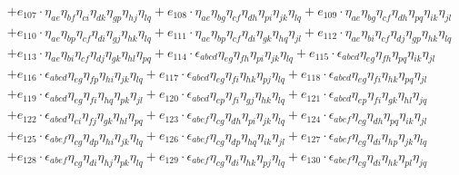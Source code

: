 \begin{itemize}
\begin{align}
    & + e_{107} \cdot \eta_{a e} \eta_{b f} \eta_{c i} \eta_{d k} \eta_{g p} \eta_{h j} \eta_{l q} + e_{108} \cdot \eta_{a e} \eta_{b g} \eta_{c f} \eta_{d h} \eta_{p i} \eta_{j k} \eta_{l q} + e_{109} \cdot \eta_{a e} \eta_{b g} \eta_{c f} \eta_{d h} \eta_{p q} \eta_{i k} \eta_{j l} \nonumber \\
    & + e_{110} \cdot \eta_{a e} \eta_{b p} \eta_{c f} \eta_{d i} \eta_{g j} \eta_{h k} \eta_{l q} + e_{111} \cdot \eta_{a e} \eta_{b p} \eta_{c f} \eta_{d i} \eta_{g k} \eta_{h q} \eta_{j l} + e_{112} \cdot \eta_{a e} \eta_{b i} \eta_{c f} \eta_{d j} \eta_{g p} \eta_{h k} \eta_{l q} \nonumber \\
    & + e_{113} \cdot \eta_{a e} \eta_{b i} \eta_{c f} \eta_{d j} \eta_{g k} \eta_{h l} \eta_{p q} + e_{114} \cdot \epsilon_{a b c d} \eta_{e g} \eta_{f h} \eta_{p i} \eta_{j k} \eta_{l q} + e_{115} \cdot \epsilon_{a b c d} \eta_{e g} \eta_{f h} \eta_{p q} \eta_{i k} \eta_{j l} \nonumber \\
    & + e_{116} \cdot \epsilon_{a b c d} \eta_{e g} \eta_{f p} \eta_{h i} \eta_{j k} \eta_{l q} + e_{117} \cdot \epsilon_{a b c d} \eta_{e g} \eta_{f i} \eta_{h k} \eta_{p j} \eta_{l q} + e_{118} \cdot \epsilon_{a b c d} \eta_{e g} \eta_{f i} \eta_{h k} \eta_{p q} \eta_{j l} \nonumber \\
    & + e_{119} \cdot \epsilon_{a b c d} \eta_{e g} \eta_{f i} \eta_{h q} \eta_{p k} \eta_{j l} + e_{120} \cdot \epsilon_{a b c d} \eta_{e p} \eta_{f i} \eta_{g j} \eta_{h k} \eta_{l q} + e_{121} \cdot \epsilon_{a b c d} \eta_{e p} \eta_{f i} \eta_{g k} \eta_{h l} \eta_{j q} \nonumber \\
    & + e_{122} \cdot \epsilon_{a b c d} \eta_{e i} \eta_{f j} \eta_{g k} \eta_{h l} \eta_{p q} + e_{123} \cdot \epsilon_{a b e f} \eta_{c g} \eta_{d h} \eta_{p i} \eta_{j k} \eta_{l q} + e_{124} \cdot \epsilon_{a b e f} \eta_{c g} \eta_{d h} \eta_{p q} \eta_{i k} \eta_{j l} \nonumber \\
    & + e_{125} \cdot \epsilon_{a b e f} \eta_{c g} \eta_{d p} \eta_{h i} \eta_{j k} \eta_{l q} + e_{126} \cdot \epsilon_{a b e f} \eta_{c g} \eta_{d p} \eta_{h q} \eta_{i k} \eta_{j l} + e_{127} \cdot \epsilon_{a b e f} \eta_{c g} \eta_{d i} \eta_{h p} \eta_{j k} \eta_{l q} \nonumber \\
    & + e_{128} \cdot \epsilon_{a b e f} \eta_{c g} \eta_{d i} \eta_{h j} \eta_{p k} \eta_{l q} + e_{129} \cdot \epsilon_{a b e f} \eta_{c g} \eta_{d i} \eta_{h k} \eta_{p j} \eta_{l q} + e_{130} \cdot \epsilon_{a b e f} \eta_{c g} \eta_{d i} \eta_{h k} \eta_{p l} \eta_{j q} \nonumber \\

\end{align}
\end{itemize}
